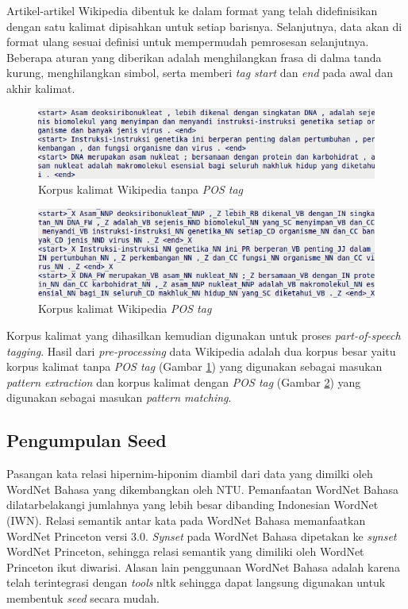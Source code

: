 Artikel-artikel Wikipedia dibentuk ke dalam format yang telah didefinisikan dengan satu kalimat dipisahkan untuk setiap barisnya. Selanjutnya, data akan di format ulang sesuai definisi untuk mempermudah pemrosesan selanjutnya. Beberapa aturan yang diberikan adalah menghilangkan frasa di dalma tanda kurung, menghilangkan simbol, serta memberi \textit{tag start} dan \textit{end} pada awal dan akhir kalimat.

\begin{figure}
    \centering
    \includegraphics[width=\linewidth]{pics/kalimatWiki}
    \caption{Korpus kalimat Wikipedia tanpa \textit{POS tag}}
    \label{fig:kalimat-wiki}
\end{figure}

\begin{figure}
    \centering
    \includegraphics[width=\linewidth]{pics/kalimatWikiTag}
    \caption{Korpus kalimat Wikipedia \textit{POS tag}}
    \label{fig:kalimat-wiki-tag}
\end{figure}

\noindent Korpus kalimat yang dihasilkan kemudian digunakan untuk proses \textit{part-of-speech tagging}. Hasil dari \textit{pre-processing} data Wikipedia adalah dua korpus besar yaitu korpus kalimat tanpa \textit{POS tag} (Gambar \ref{fig:kalimat-wiki}) yang digunakan sebagai masukan \textit{pattern extraction} dan korpus kalimat dengan \textit{POS tag} (Gambar \ref{fig:kalimat-wiki-tag}) yang digunakan sebagai masukan \textit{pattern matching}. 

\subsection{Pengumpulan Seed}
Pasangan kata relasi hipernim-hiponim diambil dari data yang dimilki oleh WordNet Bahasa yang dikembangkan oleh NTU. Pemanfaatan WordNet Bahasa dilatarbelakangi jumlahnya yang lebih besar dibanding Indonesian WordNet (IWN). Relasi semantik antar kata pada WordNet Bahasa memanfaatkan WordNet Princeton versi 3.0. \textit{Synset} pada WordNet Bahasa dipetakan ke \textit{synset} WordNet Princeton, sehingga relasi semantik yang dimiliki oleh WordNet Princeton ikut diwarisi. Alasan lain penggunaan WordNet Bahasa adalah karena telah terintegrasi dengan \textit{tools} nltk sehingga dapat langsung digunakan untuk membentuk \textit{seed} secara mudah.

